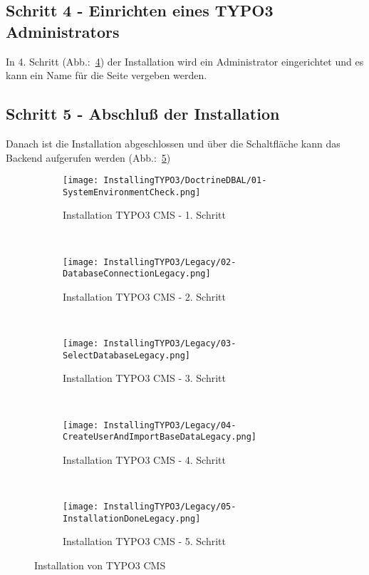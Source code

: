 \subsection{Schritt 4 - Einrichten eines TYPO3 Administrators}
\label{prototype:subsec:FourCreateAdmin}
	In 4. Schritt (Abb.:~\ref{fig:installTYPO3LegacyStepFour}) der Installation wird ein Administrator eingerichtet und es kann ein Name für die Seite vergeben werden.

\subsection{Schritt 5 - Abschluß der Installation}
\label{prototype:subsec:FiveDone}
	Danach ist die Installation abgeschlossen und über die Schaltfläche kann das Backend aufgerufen werden (Abb.:~\ref{fig:installTYPO3LegacyStepFive})

	\begin{figure}[H]
		\begin{subfigure}[b]{0.5\textwidth}
			\texttt{[image: InstallingTYPO3/DoctrineDBAL/01-SystemEnvironmentCheck.png]}
			\caption{Installation TYPO3 CMS - 1. Schritt}
			\label{fig:installTYPO3LegacyStepOne}
		\end{subfigure}%
		~ %
		\begin{subfigure}[b]{0.5\textwidth}
			\texttt{[image: InstallingTYPO3/Legacy/02-DatabaseConnectionLegacy.png]}
			\caption{Installation TYPO3 CMS - 2. Schritt}
			\label{fig:installTYPO3LegacyStepTwo}
		\end{subfigure}
		~ %
		\begin{subfigure}[b]{0.5\textwidth}
			\texttt{[image: InstallingTYPO3/Legacy/03-SelectDatabaseLegacy.png]}
			\caption{Installation TYPO3 CMS - 3. Schritt}
			\label{fig:installTYPO3LegacyStepThree}
		\end{subfigure}%
		~ %
		\begin{subfigure}[b]{0.5\textwidth}
			\texttt{[image: InstallingTYPO3/Legacy/04-CreateUserAndImportBaseDataLegacy.png]}
			\caption{Installation TYPO3 CMS - 4. Schritt}
			\label{fig:installTYPO3LegacyStepFour}
		\end{subfigure}
		~ %
		\begin{subfigure}[b]{0.5\textwidth}
			\texttt{[image: InstallingTYPO3/Legacy/05-InstallationDoneLegacy.png]}
			\caption{Installation TYPO3 CMS - 5. Schritt}
			\label{fig:installTYPO3LegacyStepFive}
		\end{subfigure}%
		\caption{Installation von TYPO3 CMS}
		\label{fig:installationOfTYPO3}
	\end{figure}

